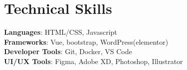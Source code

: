 \documentclass[letterpaper,11pt]{article}
\begin{document}
%
\section{Technical Skills}
 \begin{itemize}[leftmargin=0.15in, label={}]
    \small{\item{
     \textbf{Languages}{: HTML/CSS, Javascript} \\
     \textbf{Frameworks}{: Vue, bootstrap, WordPress(elementor)} \\
     \textbf{Developer Tools}{: Git, Docker, VS Code} \\
     \textbf{UI/UX Tools}{: Figma, Adobe XD, Photoshop, Illustrator}
    }}
 \end{itemize}


\end{document}
